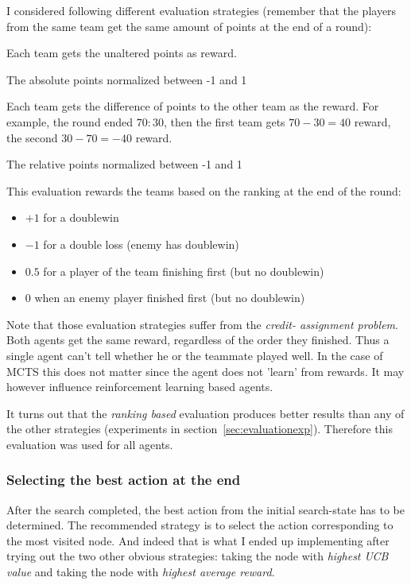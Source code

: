 I considered following different evaluation strategies (remember that the players from the same team get the same amount of points at the end of a round):
\begin{description}
    \vspace{-10px}
    \item[Absolute Points,] Each team gets the unaltered points as reward.
    \item[Absolute Normalized Points,] The absolute points normalized between -1 and 1
    \item[Relative Points,] Each team gets the difference of points to the other team as the reward. For example, the round ended $70:30$, then the first team gets $70 - 30 = 40$ reward, the second $30 - 70 = -40$ reward.
    \item[Relative Normalized Points,] The relative points normalized between -1 and 1
    \item[Ranking Based,] This evaluation rewards the teams based on the ranking at the end of the round:
        \begin{itemize}
            \vspace{-10px}
            \item $+1$ for a doublewin
            \item $-1$ for a double loss (enemy has doublewin)
            \item $0.5$ for a player of the team finishing first (but no doublewin)
            \item $0$ when an enemy player finished first (but no doublewin)
        \end{itemize}
\end{description}

Note that those evaluation strategies suffer from the \textit{credit- assignment problem}. Both agents get the same reward, regardless of the order they finished. Thus a single agent can't tell whether he or the teammate played well. In the case of MCTS this does not matter since the agent does not 'learn' from rewards. It may however influence reinforcement learning based agents.

It turns out that the \textit{ranking based} evaluation produces better results than any of the other strategies (experiments in section~\ref{sec:evaluationexp}). Therefore this evaluation was used for all agents.

\subsubsection{Selecting the best action at the end}
\label{sec:bestaction}
After the search completed, the best action from the initial search-state has to be determined.
The recommended strategy is to select the action corresponding to the most visited node. And indeed that is what I ended up implementing after trying out the two other obvious strategies: taking the node with \textit{highest UCB value} and taking the node with \textit{highest average reward}.

